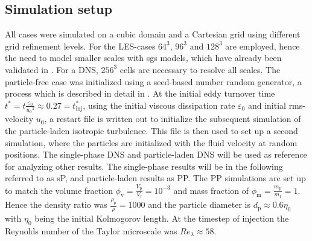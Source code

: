 \documentclass[11pt,a4paper,openany,oneside,parskip=half*]{article}
\begin{document}
\subsection{Simulation setup}
All cases were simulated on a cubic domain and a Cartesian grid using different grid refinement levels. For the LES-cases $64^3$, $96^3$ and $128^3$ are employed, hence the need to model smaller scales with sgs models, which have already been validated in \cite{ValidationOfParticleLadenLargeEddySimulationUsingHPCSystems}. For a DNS, $256^3$ cells are necessary to resolve all scales.
\newline
The particle-free case was initialized using a seed-based number random generator, a process which is described in detail in \cite{orszag1969numerical}. At the initial eddy turnover time $t^*=t\frac{\varepsilon_\mathrm{0}}{{u_\mathrm{0}}^2} \approx 0.27=t_\mathrm{inj}^*$, using the initial viscous dissipation rate $\varepsilon_\mathrm{0}$ and initial rms-velocity $u_\mathrm{0}$, a restart file is written out to initialize the subsequent simulation of the particle-laden isotropic turbulence.
\newline
This file is then used to set up a second simulation, where the particles are initialized with the fluid velocity at random positions. The single-phase DNS and particle-laden DNS will be used as reference for analyzing other results. The single-phase results will be in the following referred to as sP, and particle-laden results as PP. The PP simulations are set up to match the volume fraction $\phi_\mathrm{v}=\frac{V_\mathrm{p}}{V_\mathrm{f}}= 10^{-3}$ and mass fraction of $\phi_\mathrm{m}=\frac{m_\mathrm{p}}{m_\mathrm{f}}=1$. Hence the density ratio was $\frac{\rho_\mathrm{p}}{\rho} = 1000$ and the particle diameter is $d_\mathrm{p} \approx 0.6 \eta_\mathrm{0}$ with $\eta_\mathrm{0}$ being the initial Kolmogorov length. At the timestep of injection the Reynolds number of the Taylor microscale was $Re_\lambda \approx 58$. 
\newline
\end{document}
